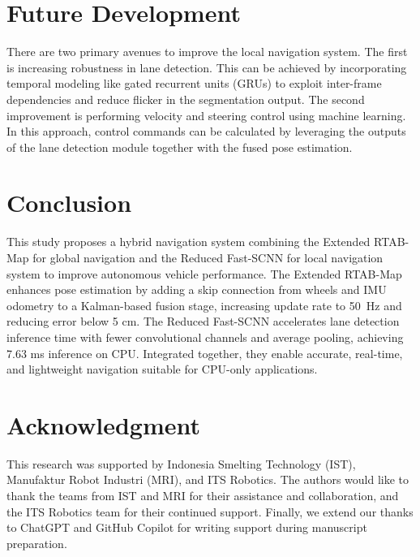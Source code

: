 \documentclass[conference, a4paper]{IEEEtran}[2015/08/26]
\begin{document}

\section{Future Development}
There are two primary avenues to improve the local navigation system. The first is increasing robustness in lane detection. This can be achieved by incorporating temporal modeling like gated recurrent units (GRUs) \cite{ref_gru} to exploit inter-frame dependencies and reduce flicker in the segmentation output. The second improvement is performing velocity and steering control using machine learning. In this approach, control commands can be calculated by leveraging the outputs of the lane detection module together with the fused pose estimation. 

\section{Conclusion} 


This study proposes a hybrid navigation system combining the Extended RTAB-Map for global navigation and the Reduced Fast-SCNN for local navigation system to improve autonomous vehicle performance. The Extended RTAB-Map enhances pose estimation by adding a skip connection from wheels and IMU odometry to a Kalman-based fusion stage, increasing update rate to 50~Hz and reducing error below 5 cm. The Reduced Fast-SCNN accelerates lane detection inference time with fewer convolutional channels and average pooling, achieving 7.63 ms inference on CPU. Integrated together, they enable accurate, real-time, and lightweight navigation suitable for CPU-only applications.

\section{Acknowledgment}
This research was supported by Indonesia Smelting Technology (IST), Manufaktur Robot Industri (MRI), and ITS Robotics. The authors would like to thank the teams from IST and MRI for their assistance and collaboration, and the ITS Robotics team for their continued support. Finally, we extend our thanks to ChatGPT and GitHub Copilot for writing support during manuscript preparation.





\end{document}
